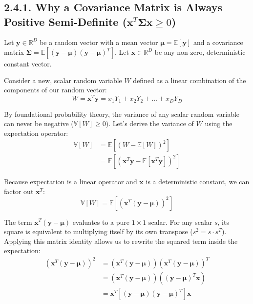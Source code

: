 \documentclass{article}
\begin{document}
\subsection*{2.4.1. Why a Covariance Matrix is Always Positive Semi-Definite ($\mathbf{x}^T \boldsymbol{\Sigma} \mathbf{x} \ge 0$)}

Let $\mathbf{y} \in \mathbb{R}^D$ be a random vector with a mean vector $\boldsymbol{\mu} = \mathbb{E}[\mathbf{y}]$ and a covariance matrix $\boldsymbol{\Sigma} = \mathbb{E}[(\mathbf{y} - \boldsymbol{\mu})(\mathbf{y} - \boldsymbol{\mu})^T]$. Let $\mathbf{x} \in \mathbb{R}^D$ be any non-zero, deterministic constant vector.

Consider a new, scalar random variable $W$ defined as a linear combination of the components of our random vector:
\begin{equation*}
W = \mathbf{x}^T \mathbf{y} = x_1 Y_1 + x_2 Y_2 + \dots + x_D Y_D
\end{equation*}

By foundational probability theory, the variance of any scalar random variable can never be negative ($\mathbb{V}[W] \ge 0$). Let's derive the variance of $W$ using the expectation operator:
\begin{align*}
\mathbb{V}[W] &= \mathbb{E}\left[ (W - \mathbb{E}[W])^2 \right] \\
&= \mathbb{E}\left[ (\mathbf{x}^T \mathbf{y} - \mathbb{E}[\mathbf{x}^T \mathbf{y}])^2 \right]
\end{align*}

Because expectation is a linear operator and $\mathbf{x}$ is a deterministic constant, we can factor out $\mathbf{x}^T$:
\begin{equation*}
\mathbb{V}[W] = \mathbb{E}\left[ \left( \mathbf{x}^T(\mathbf{y} - \boldsymbol{\mu}) \right)^2 \right]
\end{equation*}

The term $\mathbf{x}^T(\mathbf{y} - \boldsymbol{\mu})$ evaluates to a pure $1 \times 1$ scalar. For any scalar $s$, its square is equivalent to multiplying itself by its own transpose ($s^2 = s \cdot s^T$). Applying this matrix identity allows us to rewrite the squared term inside the expectation:
\begin{align*}
\left( \mathbf{x}^T(\mathbf{y} - \boldsymbol{\mu}) \right)^2 &= \left( \mathbf{x}^T(\mathbf{y} - \boldsymbol{\mu}) \right) \left( \mathbf{x}^T(\mathbf{y} - \boldsymbol{\mu}) \right)^T \\
&= \left( \mathbf{x}^T(\mathbf{y} - \boldsymbol{\mu}) \right) \left( (\mathbf{y} - \boldsymbol{\mu})^T \mathbf{x} \right) \\
&= \mathbf{x}^T \left[ (\mathbf{y} - \boldsymbol{\mu})(\mathbf{y} - \boldsymbol{\mu})^T \right] \mathbf{x}
\end{align*}
\end{document}
